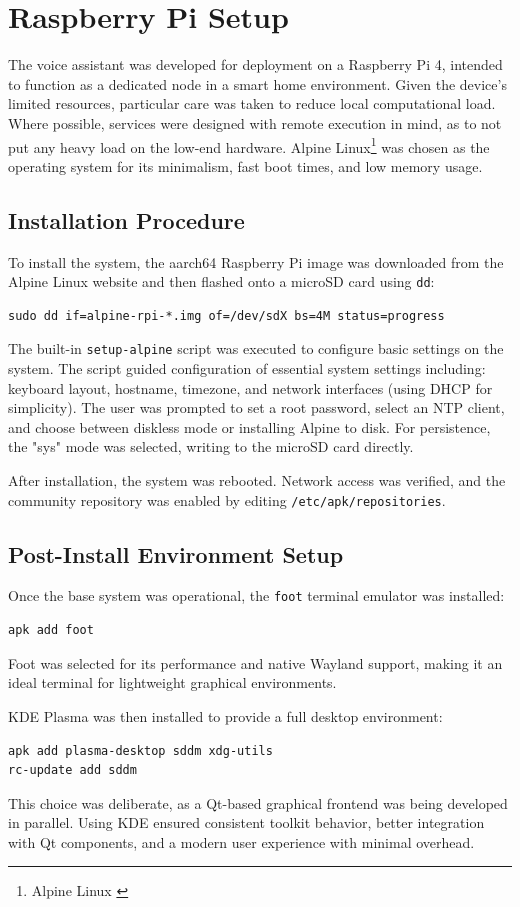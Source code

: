 \section{Raspberry Pi Setup}
The voice assistant was developed for deployment on a Raspberry Pi 4,
intended to function as a dedicated node in a smart home environment.
Given the device's limited resources, particular care was taken to reduce local computational load.
Where possible, services were designed with remote execution in mind,
as to not put any heavy load on the low-end hardware.
Alpine Linux\footnote{Alpine Linux \cite{alpine}}
was chosen as the operating system for its minimalism, fast boot times, and low memory usage.

\subsection{Installation Procedure}
To install the system, the aarch64 Raspberry Pi image was downloaded from the Alpine Linux website
and then flashed onto a microSD card using \texttt{dd}:
\begin{verbatim}
sudo dd if=alpine-rpi-*.img of=/dev/sdX bs=4M status=progress
\end{verbatim}

The built-in \texttt{setup-alpine} script was executed to configure basic settings on the system.
The script guided configuration of essential system settings including:
keyboard layout, hostname, timezone, and network interfaces (using DHCP for simplicity).
The user was prompted to set a root password, select an NTP client,
and choose between diskless mode or installing Alpine to disk.
For persistence, the "sys" mode was selected, writing to the microSD card directly.

After installation, the system was rebooted.
Network access was verified, and the community repository was enabled by editing \texttt{/etc/apk/repositories}.

\subsection{Post-Install Environment Setup}
Once the base system was operational, the \texttt{foot} terminal emulator was installed:
\begin{verbatim}
apk add foot
\end{verbatim}
Foot was selected for its performance and native Wayland support,
making it an ideal terminal for lightweight graphical environments.

KDE Plasma was then installed to provide a full desktop environment:
\begin{verbatim}
apk add plasma-desktop sddm xdg-utils
rc-update add sddm
\end{verbatim}
This choice was deliberate, as a Qt-based graphical frontend was being developed in parallel.
Using KDE ensured consistent toolkit behavior, better integration with Qt components, and a modern user experience with minimal overhead.
